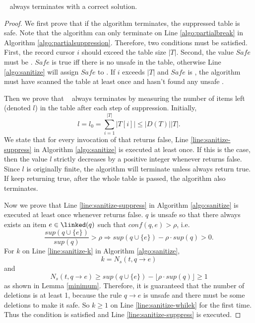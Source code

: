 \begin{Theorem}
\label{CorrectnessOfPartialSuppression}
  \PartialSuppression~ always terminates with a correct solution.
\end{Theorem}
\begin{proof}
We first prove that if the algorithm terminates, the suppressed table is safe.
Note that the algorithm can only terminate on Line \ref{algo:partialbreak}
  in Algorithm \ref{algo:partialsuppression}.
  Therefore, two conditions must be satisfied. First, the record cursor
$i$ should exceed the table size $|T|$. Second, the value $Safe$ must be \TRUE.
$Safe$ is true iff there is no unsafe \qids in the table, otherwise  Line \ref{algo:sanitize}
 will assign $Safe$ to \FALSE. If $i$ exceeds $|T|$ and
$Safe$ is \TRUE, the algorithm
must have scanned the table at least once and
hasn't found any unsafe \qids. 

Then we prove that \PartialSuppression~ always terminates by measuring the
  number of items left (denoted $l$) in the table after each step of suppression.
Initially, \[l=l_0=\sum_{i=1}^{|T|} |T[i]|\le |D(T)| |T|.\]
We state that for every invocation of \SanitizeBuffer that returns false, 
Line \ref{line:sanitize-suppress} in Algorithm \ref{algo:sanitize} is 
executed at least once.
If this is the case, then the value $l$ strictly decreases by a positive integer
whenever \SanitizeBuffer returns false. Since $l$ is originally finite,
the algorithm will terminate unless \SanitizeBuffer always return true.
If \SanitizeBuffer keep returning true, after the whole table is passed,
the algorithm also terminates.

Now we prove that Line \ref{line:sanitize-suppress} in Algorithm \ref{algo:sanitize}
  is executed at least once whenever \SanitizeBuffer returns false.
$q$ is unsafe so that there always exists an item $e\in\linked(q)$ such that $conf(q,e)>\rho$,
  i.e. \[ \frac{sup(q\cup\{e\})}{sup(q)}>\rho \Rightarrow
   sup(q\cup\{e\})-\rho\cdot sup(q)>0 .\]
For $k$ on Line \ref{line:sanitize-k} in Algorithm \ref{algo:sanitize},
  \[ k = N_s(t, q\rightarrow e)\]
  and
  \[N_s(t, q\rightarrow e) \geq sup(q\cup\{e\})-\lfloor\rho\cdot sup(q)\rfloor \ge 1\]
  as shown in Lemma \ref{minimum}. Therefore,
  it is guaranteed that the number of deletions is at least 1, 
  because the rule $q\rightarrow e$ is unsafe and there must be some deletions to make it safe.
So $k\ge 1$ on Line \ref{line:sanitize-whilek} for the first time.
Thus the condition is satisfied and Line \ref{line:sanitize-suppress} is executed.
\end{proof}

